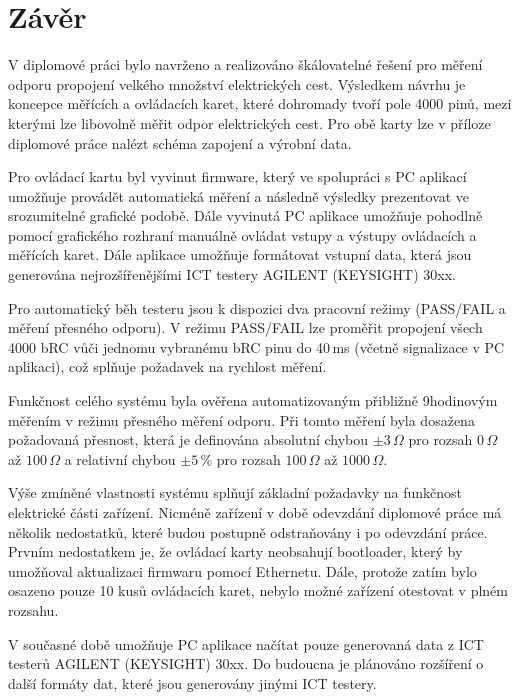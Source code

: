 \chapter*{Závěr}
{}
V diplomové práci bylo navrženo a realizováno škálovatelné řešení pro měření
odporu propojení velkého množství elektrických cest. Výsledkem návrhu
je koncepce měřících a ovládacích karet, které dohromady tvoří pole 4000 pinů,
mezi kterými lze libovolně měřit odpor elektrických cest. Pro obě karty
lze v příloze diplomové práce nalézt schéma zapojení a výrobní data.\par

Pro ovládací kartu byl vyvinut firmware, který ve spolupráci s PC aplikací umožňuje provádět automatická měření a
následně výsledky prezentovat ve srozumitelné grafické podobě. Dále vyvinutá PC aplikace umožňuje pohodlně
pomocí grafického rozhraní manuálně ovládat vstupy a výstupy ovládacích a měřících karet.
Dále aplikace umožňuje formátovat vstupní data,
která jsou generována nejrozšířenějšími ICT testery AGILENT (KEYSIGHT) 30xx.\par

Pro automatický běh testeru jsou k dispozici dva pracovní režimy (PASS/FAIL a měření přesného odporu).
V režimu PASS/FAIL lze proměřit propojení všech 4000 bRC
vůči jednomu vybranému bRC pinu do 40\,ms (včetně signalizace v PC aplikaci),
což splňuje požadavek na rychlost měření.\par

Funkčnost celého systému byla ověřena automatizovaným přibližně 9hodinovým měřením 
v režimu přesného měření odporu. Při tomto měření byla dosažena požadovaná přesnost,
která je definována absolutní chybou $\pm3\,\Omega$ pro rozsah $0\,\Omega$ až $100\,\Omega$ a relativní chybou
$\pm5\,\%$ pro rozsah $100\,\Omega$ až $1000\,\Omega$.\par

Výše zmíněné vlastnosti systému splňují základní požadavky na funkčnost elektrické části zařízení.
Nicméně zařízení v době odevzdání diplomové práce má několik nedostatků, které budou postupně odstraňovány
i po odevzdání práce. Prvním nedostatkem je, že ovládací karty neobsahují bootloader,
který by umožňoval aktualizaci firmwaru pomocí Ethernetu. Dále, protože zatím bylo osazeno pouze 10 kusů ovládacích karet,
nebylo možné zařízení otestovat v plném rozsahu.\par

V současné době umožňuje PC aplikace načítat pouze generovaná data z ICT testerů AGILENT (KEYSIGHT) 30xx.
Do budoucna je plánováno rozšíření o další formáty dat, které jsou generovány jinými ICT testery.\par


